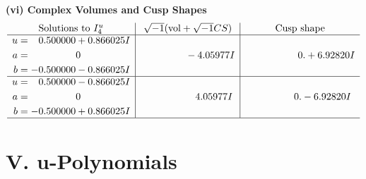 \documentclass[1p]{elsarticle_modified}
\theoremstyle{definition}
\newcommand{\I}{\sqrt{-1}}
\begin{document}
\newpage\flushleft \textbf{(vi) Complex Volumes and Cusp Shapes}
$$\begin{array}{c|c|c}  
\text{Solutions to }I^u_{4}& \I (\text{vol} + \sqrt{-1}CS) & \text{Cusp shape}\\
 \hline 
\begin{aligned}
u &= \phantom{-}0.500000 + 0.866025 I \\
a &= \phantom{-0.000000 } 0 \\
b &= -0.500000 - 0.866025 I\end{aligned}
 & \phantom{-0.000000 } -4.05977 I & \phantom{-0.000000 -}0. + 6.92820 I \\ \hline\begin{aligned}
u &= \phantom{-}0.500000 - 0.866025 I \\
a &= \phantom{-0.000000 } 0 \\
b &= -0.500000 + 0.866025 I\end{aligned}
 & \phantom{-0.000000 -}4.05977 I & \phantom{-0.000000 } 0. - 6.92820 I\\
 \hline 
 \end{array}$$\newpage
\newpage\renewcommand{\arraystretch}{1}
\centering \section*{ V. u-Polynomials}
\end{document}
